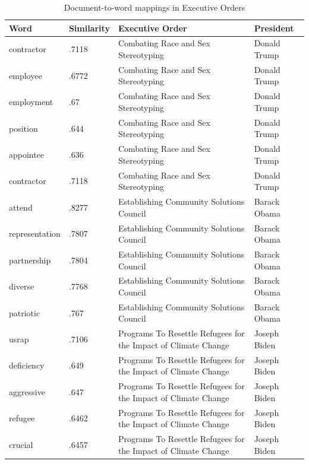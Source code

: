 \documentclass{article}
\begin{document}
{\begin{table}[H]
	\caption{Document-to-word mappings in Executive Orders}
	\centering
	\begin{tabular}{llll}
		\toprule
		\midrule
		Word  & Similarity & Executive Order & President\\
		\midrule
		\midrule
		contractor & .7118 & Combating Race and Sex Stereotyping & Donald Trump \\
		\midrule
		employee & .6772 & Combating Race and Sex Stereotyping & Donald Trump \\
		\midrule
		employment & .67 & Combating Race and Sex Stereotyping & Donald Trump \\
		\midrule
		position & .644 & Combating Race and Sex Stereotyping & Donald Trump \\
		\midrule 
		appointee & .636 & Combating Race and Sex Stereotyping & Donald Trump \\
		\midrule 
		contractor & .7118 & Combating Race and Sex Stereotyping & Donald Trump \\
		\midrule
		attend & .8277 & Establishing Community Solutions Council & Barack Obama \\
		\midrule
		representation & .7807 & Establishing Community Solutions Council & Barack Obama  \\
		\midrule
		partnership & .7804 & Establishing Community Solutions Council & Barack Obama \\
		\midrule 
		diverse & .7768 & Establishing Community Solutions Council & Barack Obama \\
		\midrule 
		patriotic & .767 & Establishing Community Solutions Council & Barack Obama \\
		\midrule
		usrap & .7106 & Programs To Resettle Refugees for the Impact of Climate Change & Joseph Biden \\
		\midrule
		deficiency & .649 & Programs To Resettle Refugees for the Impact of Climate Change & Joseph Biden \\
		\midrule
		aggressive & .647 & Programs To Resettle Refugees for the Impact of Climate Change & Joseph Biden \\
		\midrule
		refugee & .6462 & Programs To Resettle Refugees for the Impact of Climate Change & Joseph Biden \\
		\midrule 
		crucial & .6457 & Programs To Resettle Refugees for the Impact of Climate Change & Joseph Biden \\
		\bottomrule
	\end{tabular}
\end{table}

}
\end{document}
